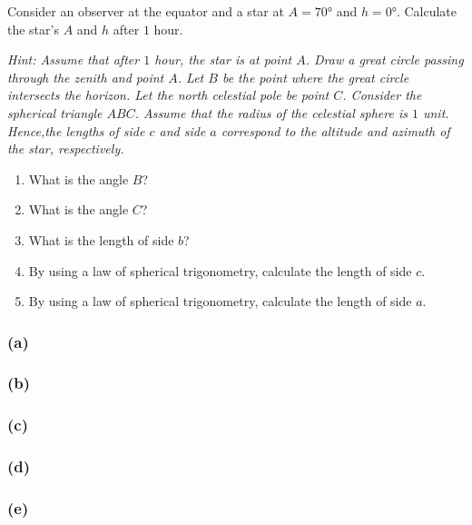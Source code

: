 \documentclass[main.tex]{subfiles}
\begin{document}
\begin{q}{5}
Consider an observer at the equator and a star at $A = \ang{70}$ and $h = \ang{0}$. Calculate the star's $A$ and $h$ after $1$ hour.

\noindent\textit{Hint: Assume that after $1$ hour, the star is at point $A$. Draw a great circle passing through the zenith and point $A$. Let $B$ be the point where the great circle intersects the horizon. Let the north celestial pole be point $C$. Consider the spherical triangle $ABC$. Assume that the radius of the celestial sphere is $1$ unit. Hence,the lengths of side $c$ and side $a$ correspond to the altitude and azimuth of the star, respectively.}
\begin{enumerate}[label=\text{(\alph*)}]
    \item What is the angle $B$?
    \item What is the angle $C$?
    \item What is the length of side $b$?
    \item By using a law of spherical trigonometry, calculate the length of side $c$.
    \item By using a law of spherical trigonometry, calculate the length of side $a$.
\end{enumerate}
\end{q}

\begin{sol}
\subsubsection*{(a)}

\subsubsection*{(b)}

\subsubsection*{(c)}

\subsubsection*{(d)}

\subsubsection*{(e)}    
\end{sol}
\end{document}
